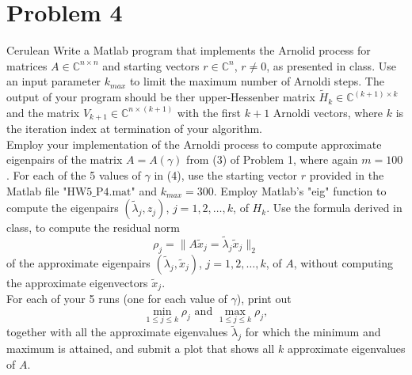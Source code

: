 \documentclass[12pt]{article}
\def\C{\mathbb{C}}
\begin{document}
\newpage
\section{Problem 4} 
\begin{mybox}{Cerulean}{}
Write a Matlab program that implements the Arnolid process for matrices $A\in\C^{n\times n}$ and starting vectors $r\in\C^n$, $r\neq 0$, as presented in class.  Use an input parameter $k_{max}$ to limit the maximum number of Arnoldi steps.  The output of your program should be ther upper-Hessenber matrix $\tilde{H}_k \in\C^{(k+1)\times k}$ and the matrix $V_{k+1}\in\C^{n\times(k+1)}$ with the first $k+1$ Arnoldi vectors, where $k$ is the iteration index at termination of your algorithm.\\
Employ your implementation of the Arnoldi process to compute approximate eigenpairs of the matrix $A = A(\gamma)$ from (3) of Problem 1, where again $m=100$.  For each of the 5 values of $\gamma$ in (4), use the starting vector $r$ provided in the Matlab file $\text{"HW5\_P4.mat"}$ and $k_{max} = 300$.  Employ Matlab's "eig" function to compute the eigenpairs $(\tilde{\lambda}_j,z_j)$, $j=1,2,\dots,k$, of $H_k$.  Use the formula derived in class, to compute the residual norm
$$\rho_j = \|A\tilde{x}_j = \tilde{\lambda}_j\tilde{x}_j\|_2$$
of the approximate eigenpairs $(\tilde{\lambda}_j,\tilde{x}_j)$, $j=1,2,\dots,k$, of $A$, without computing the approximate eigenvectors $\tilde{x}_j$.\\
For each of your 5 runs (one for each value of $\gamma$), print out
$$\min_{1\leq j \leq k} \rho_j \text{ and } \max_{1\leq j \leq k} \rho_j,$$
together with all the approximate eigenvalues $\tilde{\lambda}_j$ for which the minimum and maximum is attained, and submit a plot that shows all $k$ approximate eigenvalues of $A$.
\end{mybox}
\end{document}
